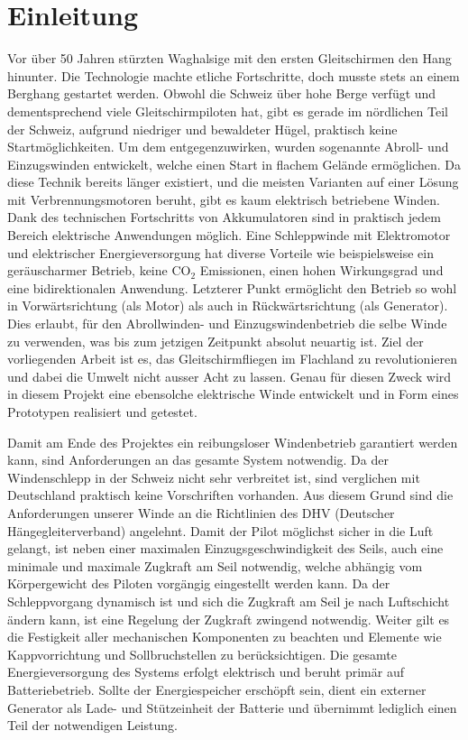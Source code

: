 \section{Einleitung}
Vor über 50 Jahren stürzten Waghalsige mit den ersten Gleitschirmen den Hang hinunter. Die Technologie machte etliche Fortschritte, doch musste stets an einem Berghang gestartet werden. Obwohl die Schweiz über hohe Berge verfügt und dementsprechend viele Gleitschirmpiloten hat, gibt es gerade im nördlichen Teil der Schweiz, aufgrund niedriger und bewaldeter Hügel, praktisch keine Startmöglichkeiten. Um dem entgegenzuwirken, wurden sogenannte Abroll- und Einzugswinden entwickelt, welche einen Start in flachem Gelände ermöglichen. Da diese Technik bereits länger existiert, und die meisten Varianten auf einer Lösung mit Verbrennungsmotoren beruht, gibt es kaum elektrisch betriebene Winden. Dank des technischen Fortschritts von Akkumulatoren sind in praktisch jedem Bereich elektrische Anwendungen möglich. Eine Schleppwinde mit Elektromotor und elektrischer Energieversorgung hat diverse Vorteile wie beispielsweise ein geräuscharmer Betrieb, keine CO$_{2}$ Emissionen, einen hohen Wirkungsgrad und eine bidirektionalen Anwendung. Letzterer Punkt ermöglicht den Betrieb so wohl in Vorwärtsrichtung (als Motor) als auch in Rückwärtsrichtung (als Generator). Dies erlaubt, für den Abrollwinden- und Einzugswindenbetrieb die selbe Winde zu verwenden, was bis zum jetzigen Zeitpunkt absolut neuartig ist. 
Ziel der vorliegenden Arbeit ist es, das Gleitschirmfliegen im Flachland zu revolutionieren und dabei die Umwelt nicht ausser Acht zu lassen. Genau für diesen Zweck wird in diesem Projekt eine ebensolche elektrische Winde entwickelt und in Form eines Prototypen realisiert und getestet.

Damit am Ende des Projektes ein reibungsloser Windenbetrieb garantiert werden kann, sind Anforderungen an das gesamte System notwendig. Da der Windenschlepp in der Schweiz nicht sehr verbreitet ist, sind verglichen mit Deutschland praktisch keine Vorschriften vorhanden. Aus diesem Grund sind die Anforderungen unserer Winde an die Richtlinien des DHV (Deutscher Hängegleiterverband) angelehnt.
Damit der Pilot möglichst sicher in die Luft gelangt, ist neben einer maximalen Einzugsgeschwindigkeit des Seils, auch eine minimale und maximale Zugkraft am Seil notwendig, welche abhängig vom Körpergewicht des Piloten vorgängig eingestellt werden kann. Da der Schleppvorgang dynamisch ist und sich die Zugkraft am Seil je nach Luftschicht ändern kann, ist eine Regelung der Zugkraft zwingend notwendig. Weiter gilt es die Festigkeit aller mechanischen Komponenten zu beachten und Elemente wie Kappvorrichtung und Sollbruchstellen zu berücksichtigen. Die gesamte Energieversorgung des Systems erfolgt elektrisch und beruht primär auf Batteriebetrieb. Sollte der Energiespeicher erschöpft sein, dient ein externer Generator als Lade- und Stützeinheit der Batterie und übernimmt lediglich einen Teil der notwendigen Leistung.

